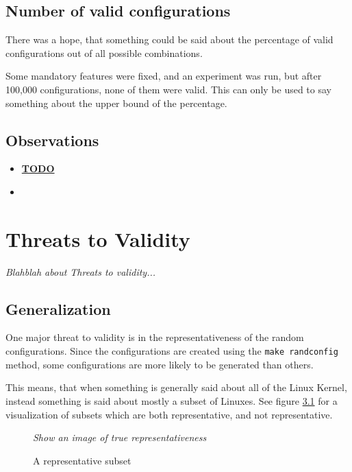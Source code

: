 \documentclass[a4paper,11pt]{report}
\newcommand{\textcode}[1]{
    \fboxsep=1pt
    \texttt{\colorbox{gray!20}{#1}}
}
\newcommand{\figa}{
    \begin{figure}[!htpb]
    \centering
}
\newcommand{\figb}[2]{
    \caption{#1}
    \label{#2}
    \end{figure}
}
\begin{document}
    \section{Number of valid configurations}

There was a hope, that something could be said about the percentage of valid 
configurations out of all possible combinations.

Some mandatory features were fixed, and an experiment was run, but after 100,000
configurations, none of them were valid. This can only be used to say something
about the upper bound of the percentage.

\section{Observations}


\begin{itemize}
    \item \underline{\textbf{TODO}}
        \item 
\end{itemize}


\newpage
    \chapter{Threats to Validity}
\label{ch:ttv}

\emph{Blahblah about Threats to validity...}

\section{Generalization}
\label{sec:gen}

One major threat to validity is in the representativeness of the random 
configurations. Since the configurations are created using the \textcode{make 
randconfig} method, some configurations are more likely to be generated than 
others.

This means, that when something is generally said about all of the Linux 
Kernel, instead something is said about mostly a subset of Linuxes. See figure 
\ref{fig:repsubset} for a visualization of subsets which are both 
representative, and not representative.

\figa
    \emph{Show an image of true representativeness}
\figb{A representative subset}{fig:repsubset}
\end{document}
